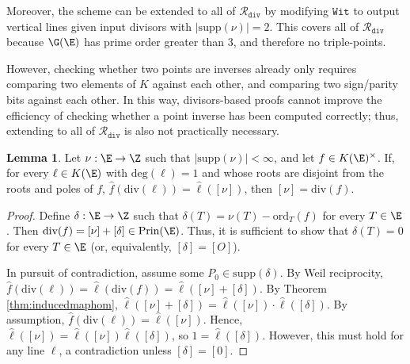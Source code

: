 \documentclass[11pt,letterpaper]{article}
\theoremstyle{definition}
\newtheorem{lemm}[theorem]{Lemma}
\newcommand{\6}{\mathbf}
\newcommand{\7}{\mathcal}
\begin{document}
Moreover, the scheme can be extended to all of $\mathcal{R}_{\texttt{div}}$ by modifying $\texttt{Wit}$ to output vertical lines given input divisors with $\left|\text{supp}(\nu)\right| = 2$. This covers all of $\mathcal{R}_{\texttt{div}}$ because $\G(\E)$ has prime order greater than $3$, and therefore no triple-points.

However, checking whether two points are inverses already only requires comparing two elements of $K$ against each other, and comparing two sign/parity bits against each other. In this way, divisors-based proofs cannot improve the efficiency of checking whether a point inverse has been computed correctly; thus, extending to all of $\mathcal{R}_{\texttt{div}}$ is also not practically necessary.

\begin{lemm}
Let $\nu: \E \to \Z$ such that $\left|\text{supp}(\nu)\right| < \infty$, and let $f \in K(\E)^\times$. If, for every $\ell \in K(\E)$ with $\text{deg}(\ell) = 1$ and whose roots are disjoint from the roots and poles of $f$, $\widehat{f}(\text{div}(\ell)) = \widehat{\ell}([\nu])$, then $[\nu] = \text{div}(f)$.
\label{lem:biggestlemma}
\end{lemm}
\begin{proof}
Define $\delta: \E \to \Z$ such that $\delta(T) = \nu(T) - \text{ord}_T(f)$ for every $T \in \E$. Then $\text{div}(f)=[\nu] + [\delta] \in \text{Prin}(\E)$. Thus, it is sufficient to show that $\delta(T) = 0$ for every $T \in \E$ (or, equivalently, $[\delta] = [O]$).

In pursuit of contradiction, assume some $P_0 \in \text{supp}(\delta)$. By Weil reciprocity, $\widehat{f}(\text{div}(\ell)) = \widehat{\ell}(\text{div}(f)) = \widehat{\ell}([\nu] + [\delta])$. By Theorem \ref{thm:inducedmaphom}, $\widehat{\ell}([\nu] + [\delta]) = \widehat{\ell}([\nu]) \cdot \widehat{\ell}([\delta])$. By assumption, $\widehat{f}(\text{div}(\ell)) = \widehat{\ell}([\nu])$. Hence, $\widehat{\ell}([\nu]) = \widehat{\ell}([\nu])\widehat{\ell}([\delta])$, so $1 = \widehat{\ell}([\delta])$. However, this must hold for any line $\ell$, a contradiction unless $[\delta] = [0]$.
\end{proof}
\end{document}

